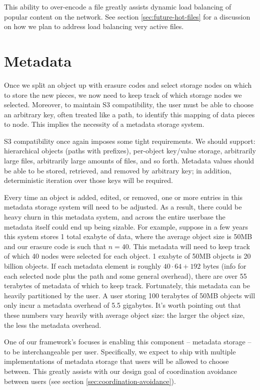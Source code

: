\documentclass[11pt,fleqn,openany]{book}
\begin{document}
This ability to over-encode a file greatly assists dynamic load balancing of
popular content on the network. See section \ref{sec:future-hot-files} for
a discussion on how we plan to address load balancing very active files.

\section{Metadata}

Once we split an object up with erasure codes and select storage nodes on
which to store the new pieces, we now need to keep track of which storage
nodes we selected.
Moreover, to maintain S3 compatibility, the user must be able to choose an
arbitrary key, often treated like a path, to identify this mapping of data
pieces to node. This implies the necessity of a metadata storage system.

S3 compatibility once again imposes some tight requirements.
We should support:
hierarchical objects (paths with prefixes), per-object key/value storage,
arbitrarily large files, arbitrarily large amounts of files, and so forth.
Metadata values
should be able to be stored, retrieved, and removed by arbitrary key; in addition,
deterministic iteration over those keys will be required.

Every time an
object is added, edited, or removed, one or more entries in this metadata
storage system will need to be adjusted. As a result, there could be heavy churn
in this metadata system, and across the entire userbase the metadata itself
could end up being sizable.
For example, suppose in
a few years this system stores 1 total exabyte of data, where the average object
size is 50MB and our erasure code is such that $n=40$. This metadata will need
to keep track of which 40 nodes were selected for each object.
1 exabyte of 50MB objects is 20 billion objects. If
each metadata element is roughly $40\cdot 64+192$ bytes (info for each
selected node plus the path and some general overhead), there are over 55
terabytes of metadata of which to keep track.
Fortunately, this metadata can be heavily partitioned by the user. A user storing
100 terabytes of 50MB objects will only incur a metadata overhead of 5.5
gigabytes. It's worth pointing out that these numbers vary
heavily with average object size: the larger the object size, the less the
metadata overhead.

One of our framework's focuses is enabling this component -- metadata
storage -- to be interchangeable per user. Specifically, we expect to ship with
multiple implementations of metadata storage that users will be allowed to
choose between. This greatly assists with our design goal of coordination
avoidance between users (see section \ref{sec:coordination-avoidance}).
\end{document}
